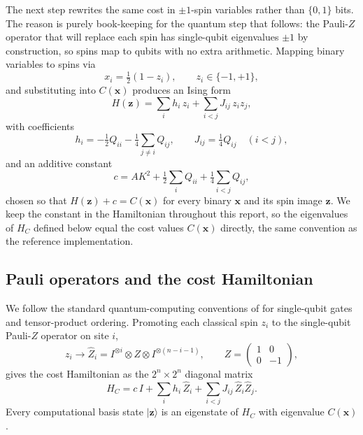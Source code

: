 The next step rewrites the same cost in $\pm 1$-spin variables rather than $\{0,1\}$ bits. The reason is purely book-keeping for the quantum step that follows: the Pauli-$Z$ operator that will replace each spin has single-qubit eigenvalues $\pm 1$ by construction, so spins map to qubits with no extra arithmetic. Mapping binary variables to spins via
\begin{equation}
    x_i = \tfrac{1}{2}(1-z_i),\qquad z_i\in\{-1,+1\},
\end{equation}
and substituting into $C(\boldsymbol{x})$ produces an Ising form
\begin{equation}\label{eq:Hz}
    H(\boldsymbol{z}) = \sum_i h_i\, z_i + \sum_{i<j} J_{ij}\, z_i z_j,
\end{equation}
with coefficients
\begin{equation}\label{eq:hJ}
    h_i = -\tfrac{1}{2} Q_{ii} - \tfrac{1}{4} \sum_{j\neq i} Q_{ij},
    \qquad
    J_{ij} = \tfrac{1}{4} Q_{ij} \quad (i<j),
\end{equation}
and an additive constant
\begin{equation}\label{eq:c}
    c = AK^2 + \tfrac{1}{2}\sum_i Q_{ii} + \tfrac{1}{4}\sum_{i<j} Q_{ij},
\end{equation}
chosen so that $H(\boldsymbol{z}) + c = C(\boldsymbol{x})$ for every binary $\boldsymbol{x}$ and its spin image $\boldsymbol{z}$. We keep the constant in the Hamiltonian throughout this report, so the eigenvalues of $H_C$ defined below equal the cost values $C(\boldsymbol{x})$ directly, the same convention as the reference implementation.


\subsection{Pauli operators and the cost Hamiltonian}\label{subsec:pauli}

We follow the standard quantum-computing conventions of \textcite{nielsen_chuang} for single-qubit gates and tensor-product ordering. Promoting each classical spin $z_i$ to the single-qubit Pauli-$Z$ operator on site $i$,
\begin{equation}
    z_i \longrightarrow \hat{Z}_i = I^{\otimes i}
    \otimes Z \otimes I^{\otimes (n-i-1)},
    \qquad
    Z = \begin{pmatrix} 1 & 0 \\ 0 & -1 \end{pmatrix},
\end{equation}
gives the cost Hamiltonian as the $2^n\times 2^n$ diagonal matrix
\begin{equation}\label{eq:HC}
    \boxed{
    H_C = c\, I + \sum_i h_i\, \hat{Z}_i + \sum_{i<j} J_{ij}\, \hat{Z}_i \hat{Z}_j.
    }
\end{equation}
Every computational basis state $|\boldsymbol{z}\rangle$ is an eigenstate of $H_C$ with eigenvalue $C(\boldsymbol{x})$.

